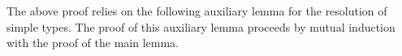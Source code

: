 The above proof relies on the following auxiliary lemma for the 
resolution of simple types. The proof of this auxiliary lemma proceeds
by mutual induction with the proof of the main lemma.

{\centering
{}}

